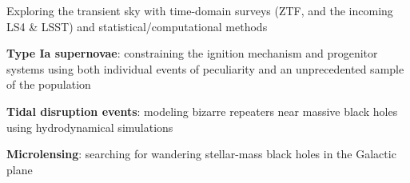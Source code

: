 


\begin{cvpubs}


\cvpub
{ %
\begin{cvitems}
\item Exploring the transient sky with time-domain surveys (ZTF, and the incoming LS4 \& LSST) and statistical/computational methods
\item {\bf Type Ia supernovae}: constraining the ignition mechanism and progenitor systems using both individual events of peculiarity and an unprecedented sample of the population
\item {\bf Tidal disruption events}: modeling bizarre repeaters near massive black holes using hydrodynamical simulations
\item {\bf Microlensing}: searching for wandering stellar-mass black holes in the Galactic plane
\end{cvitems}
}


\end{cvpubs}